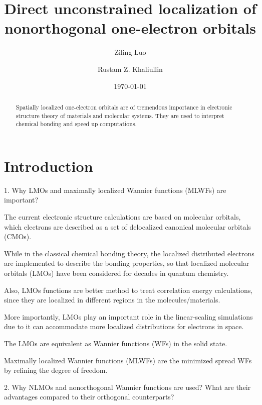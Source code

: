 \documentclass[aps,prl,reprint,amsmath,amssymb]{revtex4-1}
\begin{document}



\title{
Direct unconstrained localization of nonorthogonal one-electron orbitals
}

\author{Ziling Luo}
\author{Rustam Z. Khaliullin}

\date{\today}

\begin{abstract}
Spatially localized one-electron orbitals are of tremendous importance in electronic structure theory of materials and molecular systems. 
They are used to interpret chemical bonding and speed up computations. 
\end{abstract}

\maketitle

\section{Introduction} 

1. Why LMOs and maximally localized Wannier functions (MLWFs) are important?

The current electronic structure calculations are based on molecular orbitals, which electrons are described as a set of delocalized canonical molecular orbitals (CMOs).

While in the classical chemical bonding theory, the localized distributed electrons are implemented to describe the bonding properties, so that localized molecular orbitals (LMOs) have been considered for decades in quantum chemistry.

Also, LMOs functions are better method to treat correlation energy calculations, since they are localized in different regions in the molecules/materials.

More importantly, LMOs play an important role in the linear-scaling simulations due to it can accommodate more localized distributions for electrons in space.

The LMOs are equivalent as Wannier functions (WFs) in the solid state. 

Maximally localized Wannier functions (MLWFs) are the minimized spread WFs by refining the degree of freedom.

2. Why NLMOs and nonorthogonal Wannier functions are used? What are their advantages compared to their orthogonal counterparts?
\end{document}
